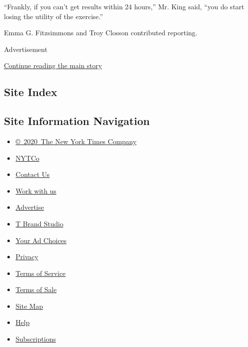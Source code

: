 ``Frankly, if you can't get results within 24 hours,'' Mr. King said,
``you do start losing the utility of the exercise.''

Emma G. Fitzsimmons and Troy Closson contributed reporting.

Advertisement

\protect\hyperlink{after-bottom}{Continue reading the main story}

\hypertarget{site-index}{%
\subsection{Site Index}\label{site-index}}

\hypertarget{site-information-navigation}{%
\subsection{Site Information
Navigation}\label{site-information-navigation}}

\begin{itemize}
\tightlist
\item
  \href{https://help.nytimes.com/hc/en-us/articles/115014792127-Copyright-notice}{©~2020~The
  New York Times Company}
\end{itemize}

\begin{itemize}
\tightlist
\item
  \href{https://www.nytco.com/}{NYTCo}
\item
  \href{https://help.nytimes.com/hc/en-us/articles/115015385887-Contact-Us}{Contact
  Us}
\item
  \href{https://www.nytco.com/careers/}{Work with us}
\item
  \href{https://nytmediakit.com/}{Advertise}
\item
  \href{http://www.tbrandstudio.com/}{T Brand Studio}
\item
  \href{https://www.nytimes.com/privacy/cookie-policy\#how-do-i-manage-trackers}{Your
  Ad Choices}
\item
  \href{https://www.nytimes.com/privacy}{Privacy}
\item
  \href{https://help.nytimes.com/hc/en-us/articles/115014893428-Terms-of-service}{Terms
  of Service}
\item
  \href{https://help.nytimes.com/hc/en-us/articles/115014893968-Terms-of-sale}{Terms
  of Sale}
\item
  \href{https://spiderbites.nytimes.com}{Site Map}
\item
  \href{https://help.nytimes.com/hc/en-us}{Help}
\item
  \href{https://www.nytimes.com/subscription?campaignId=37WXW}{Subscriptions}
\end{itemize}
